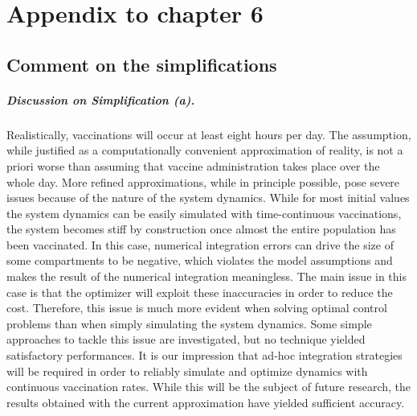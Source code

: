 
\chapter{Appendix to chapter 6}

\section{Comment on the simplifications}
\paragraph{Discussion on Simplification (a).}
Realistically, vaccinations will occur at least eight hours per day. The assumption, while justified as a computationally convenient approximation of reality, is not a priori worse than assuming that vaccine administration takes place over the whole day. More refined approximations, while in principle possible, pose severe issues because of the nature of the system dynamics. While for most initial values the system dynamics can be easily simulated with time-continuous vaccinations, the system becomes stiff by construction once almost the entire population has been vaccinated. In this case, numerical integration errors can drive the size of some compartments to be negative, which violates the model assumptions and makes the result of the numerical integration meaningless. The main issue in this case is that the optimizer will exploit these inaccuracies in order to reduce the cost. Therefore, this issue is much more evident when solving optimal control problems than when simply simulating the system dynamics. Some simple approaches to tackle this issue are investigated, but no technique yielded satisfactory performances. It is our impression that ad-hoc integration strategies will be required in order to reliably simulate and optimize dynamics with continuous vaccination rates. While this will be the subject of future research, the results obtained with the current approximation have yielded sufficient accuracy.

